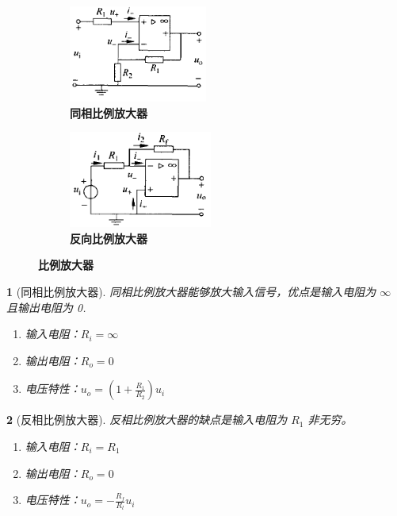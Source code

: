 \documentclass[UTF8]{report}
\theoremstyle{MyLineTheoremStyle} %
\theoremstyle{MyBlockTheoremStyle} %
\theoremstyle{MySubsubsectionStyle} %
\newtheorem{definition}{}
\begin{document}
\begin{figure}[H]\centering
    \begin{subfigure}[t]{0.37\textwidth}\centering
        \includegraphics[height=90pt]{assets/1,2/同相比例放大器.png}
        \caption{\bfseries 同相比例放大器}
    \end{subfigure}\begin{subfigure}[t]{0.37\textwidth}\centering
        \includegraphics[height=90pt]{assets/1,2/反向比例放大器.png}
        \caption{\bfseries 反向比例放大器}
    \end{subfigure}
    \caption{\bfseries 比例放大器}
\end{figure}

\begin{definition}[同相比例放大器]
同相比例放大器能够放大输入信号，优点是输入电阻为 $\infty$ 且输出电阻为 0.
\begin{enumerate}
\item 输入电阻：$R_i = \infty$
\item 输出电阻：$R_o = 0$
\item 电压特性：$u_o = (1+\frac{R_1}{R_2})u_i$
\end{enumerate}
\end{definition}


\begin{definition}[反相比例放大器]
反相比例放大器的缺点是输入电阻为 $R_1$ 非无穷。
\begin{enumerate}
\item 输入电阻：$R_i = R_1$
\item 输出电阻：$R_o = 0$
\item 电压特性：$u_o = - \frac{R_f}{R_l} u_i$
\end{enumerate}
\end{definition}
\end{document}
